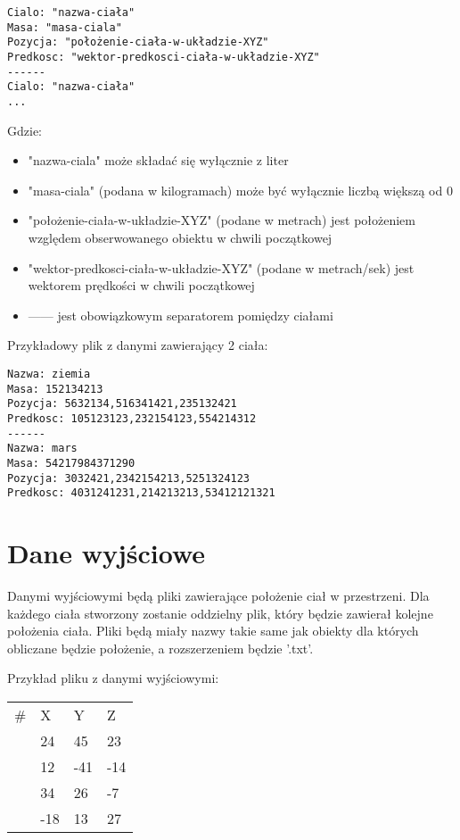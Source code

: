 \documentclass[a4paper,11pt,notitlepage]{article}
\begin{document}
\footnotesize\begin{verbatim}
Cialo: "nazwa-ciała"
Masa: "masa-ciala"
Pozycja: "położenie-ciała-w-układzie-XYZ"
Predkosc: "wektor-predkosci-ciała-w-układzie-XYZ"
------
Cialo: "nazwa-ciała"
...
\end{verbatim}\normalsize
\vspace{0.1in}
Gdzie:
\begin{itemize}[noitemsep]
		\item "nazwa-ciala" może składać się wyłącznie z liter
		\item "masa-ciala" (podana w kilogramach) może być wyłącznie liczbą większą od 0  
		\item "położenie-ciała-w-układzie-XYZ" (podane w metrach) jest położeniem względem obserwowanego obiektu w chwili początkowej
		\item "wektor-predkosci-ciała-w-układzie-XYZ" (podane w metrach/sek) jest wektorem prędkości w chwili początkowej
		\item ------ jest obowiązkowym separatorem pomiędzy ciałami
	\end{itemize}

\vspace{0.1in}
Przykładowy plik z danymi zawierający 2 ciała:

\vspace{0.1in}

\footnotesize\begin{verbatim}
Nazwa: ziemia
Masa: 152134213
Pozycja: 5632134,516341421,235132421
Predkosc: 105123123,232154123,554214312
------
Nazwa: mars
Masa: 54217984371290
Pozycja: 3032421,2342154213,5251324123
Predkosc: 4031241231,214213213,53412121321
\end{verbatim}\normalsize
\section{Dane wyjściowe}
Danymi wyjściowymi będą pliki zawierające położenie ciał w przestrzeni. Dla każdego ciała stworzony zostanie oddzielny plik, który będzie zawierał kolejne położenia ciała. Pliki będą miały nazwy takie same jak obiekty dla których obliczane będzie położenie, a rozszerzeniem będzie '.txt'.

\vspace{0.1in}
Przykład pliku z danymi wyjściowymi:

\vspace{0.1in}
\begin{tabular}{llll}

\#& X & Y & Z\\
 & 24 & 45 & 23\\
 & 12 & -41 & -14\\
 & 34 & 26 & -7\\
 & -18 & 13 & 27\\
\end{tabular}
\end{document}
